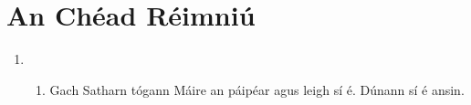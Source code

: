 \documentclass[article,a4paper]{memoir}
\begin{document}
\chapter*{An Ch\'{e}ad R\'{e}imniú}

\begin{enumerate}
	\item 	\begin{enumerate}
			\item Gach Satharn tógann Máire an páip\'{e}ar agus
				leigh sí \'{e}. Dúnann sí \'{e} ansin.
		\end{enumerate}
\end{enumerate}
\end{document}
